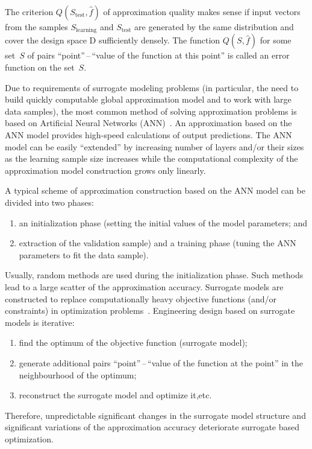 \begin{multicols}{2}
The criterion $Q\left( S_{\mathrm{test}}, \hat f \right)$ 
of approximation quality makes sense if input vectors from the samples $S_{\mathrm{learning}}$ 
and $S_{\mathrm{test}}$ are generated by the same distribution and cover the design space 
$\mathrm{D}$ sufficiently densely.
The function $Q\left( S, \hat f \right)$ for some set~$S$ 
of pairs ``point''\,--\,``value of the function at this point'' is called an 
error function on the set~$S$.

\medskip

Due to requirements of surrogate modeling problems (in particular, the need to build quickly 
computable global approximation model and to work with large data samples),
   the most common method of solving approximation problems is based on Artificial Neural Networks (ANN)~\cite{elementsOfStatLearning}. 
An approximation based on the ANN model provides high-speed calculations of output predictions. The ANN model can be easily ``extended'' 
by increasing number of layers and/or their sizes as the learning sample size increases while the computational complexity of the 
approximation model construction grows only linearly.

A typical scheme of approximation construction based on the ANN model can be 
divided into two phases:
\begin{enumerate}[(1)]
\item an initialization phase (setting the initial values of the 
model parameters;  and \\[-9pt]
\item extraction of the validation sample) and a training phase (tuning the ANN 
 parameters to fit the data sample).
 \end{enumerate}
  Usually, random methods are used during the 
 initialization phase. Such methods lead to a large scatter of the approximation accuracy.
 Surrogate models are constructed to replace computationally 
 heavy objective functions (and/or constraints) in optimization problems~\cite{copti}. 
 Engineering design based on surrogate models is iterative:
 \begin{enumerate}[(1)]
 \item  find the optimum of the 
 objective function (surrogate model);\\[-9pt]
 \item  generate additional pairs
   ``point''\,--\,``value of the function at the point'' in the neighbourhood of the optimum;\\[-9pt] 
\item reconstruct the surrogate model and optimize it,\linebreak etc.
\end{enumerate}
 Therefore, 
  unpredictable significant changes in the surrogate model structure and significant variations of 
  the approximation accuracy deteriorate surrogate based optimization.


\end{multicols}
